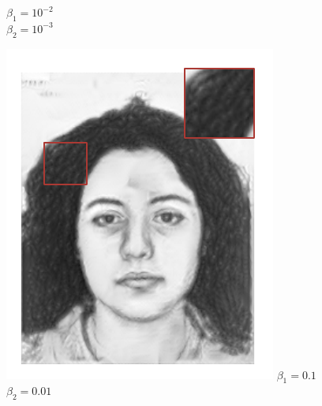 \documentclass[10pt,twocolumn,letterpaper]{article}
\begin{document}
\begin{figure}[htbp]
\begin{minipage}[t]{0.16\linewidth}
$\beta_1  = 10^{-2} $\\
$\beta_2  = 10^{-3} $
\end{minipage}
\begin{minipage}[t]{0.16\linewidth}
\centering
\includegraphics[width=0.99\linewidth]{img/effective_eval/2_alpha.pdf}
$\beta_1  = 0.1 $\\
$\beta_2  = 0.01 $
\end{minipage}
\begin{minipage}[t]{0.16\linewidth}
\centering

\end{minipage}
\end{figure}
\end{document}
